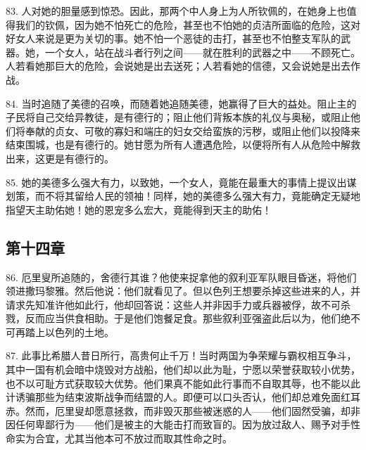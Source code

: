 83. 人对她的胆量感到惊恐。因此，那两个中人身上为人所钦佩的，在她身上也值得我们的钦佩，因为她不怕死亡的危险，甚至也不怕她的贞洁所面临的危险，这对好女人来说是更为关切的事。她不怕一个恶徒的击打，甚至也不怕整支军队的武器。她，一个女人，站在战斗者行列之间——就在胜利的武器之中——不顾死亡。人若看她那巨大的危险，会说她是出去送死；人若看她的信德，又会说她是出去作战。\par

84. 当时追随了美德的召唤，而随着她追随美德，她赢得了巨大的益处。阻止主的子民将自己交给异教徒，是有德行的；阻止他们背叛本族的礼仪与奥秘，或阻止他们将奉献的贞女、可敬的寡妇和端庄的妇女交给蛮族的污秽，或阻止他们以投降来结束围城，也是有德行的。她甘愿为所有人遭遇危险，以便将所有人从危险中解救出来，这更是有德行的。\par

85. 她的美德多么强大有力，以致她，一个女人，竟能在最重大的事情上提议出谋划策，而不将其留给人民的领袖！同样，她的美德多么强大有力，竟能确定无疑地指望天主助佑她！她的恩宠多么宏大，竟能得到天主的助佑！\par


\subsection{第十四章}

\par

86. 厄里叟所追随的，舍德行其谁？他使来捉拿他的叙利亚军队眼目昏迷，将他们领进撒玛黎雅。然后他说：他们就看见了。但以色列王想要杀掉这些进来的人，并请求先知准许他如此行，他却回答说：这些人并非因手力或兵器被俘，故不可杀戮，反而应当供食相助。于是他们饱餐足食。那些叙利亚强盗此后以为，他们绝不可再踏上以色列的土地。\par

87. 此事比希腊人昔日所行，高贵何止千万！当时两国为争荣耀与霸权相互争斗，其中一国有机会暗中烧毁对方战船，他们却以此为耻，宁愿以荣誉获取较小优势，也不以可耻方式获取较大优势。他们果真不能如此行事而不自取其辱，也不能以此计诱骗那些为结束波斯战争而结盟的人。即便可以口头否认，他们却总难免面红耳赤。然而，厄里叟却愿意拯救，而非毁灭那些被迷惑的人——他们固然受骗，却非因任何卑鄙行为——他们是被主的大能击打而致盲的。因为放过敌人、赐予对手性命实为合宜，尤其当他本可不放过而取其性命之时。\par

